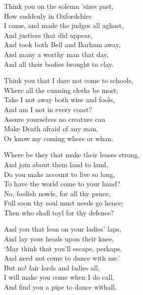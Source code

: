 \pagebreak

\begin{dcverse}
\begin{patverse}
Think you on the solemn ’sizes past,\\
How suddenly in Oxfordshire\\
I came, and made the judges all aghast,\\
And justices that did appear,\\
And took both Bell and Barham away,\footnotemark\\
And many a worthy man that day,\\
And all their bodies brought to clay.
\end{patverse}

\begin{patverse}
Think you that I dare not come to schools,\\
Where all the cunning clerks be most;\\
Take I not away both wise and fools,\\
And am I not in every coast?\\
Assure yourselves no creature can\\
Make Death afraid of any man,\\
Or know my coming where or whan.
\end{patverse}

\begin{patverse}
Where be they that make their leases strong,\\
And join about them land to land,\\
Do you make account to live so long,\\
To have the world come to your hand?\\
No, foolish nowle, for all thy pence,\\
Full soon thy soul must needs go hence;\\
Then who shall toyl for thy defence?
\end{patverse}

\begin{patverse}
And you that lean on your ladies’ laps,\\
And lay your heads upon their knee,\\
‘May think that you’ll escape, perhaps,\\
And need not come to dance with me.’\\
But no! fair lords and ladies all,\\
I will make you come when I do call,\\
And find you a pipe to dance withall.
\end{patverse}


\end{dcverse}
